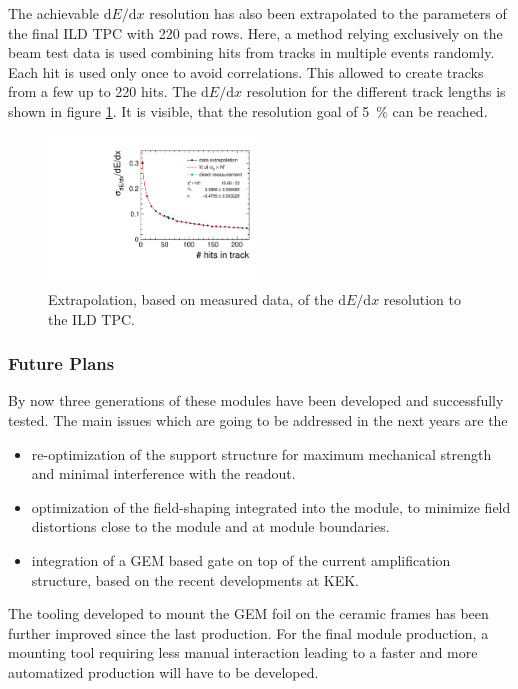 The achievable \ensuremath{\mathrm{d}E/\mathrm{d}x} resolution has also been extrapolated to the parameters of the final ILD TPC with \num{220} pad rows.
Here, a method relying exclusively on the beam test data is used combining hits from tracks in multiple events randomly.
Each hit is used only once to avoid correlations.
This allowed to create tracks from a few up to 220 hits.
The \ensuremath{\mathrm{d}E/\mathrm{d}x} resolution for the different track lengths is shown in figure \ref{sfig:dedx_reso_ILD}.
It is visible, that the resolution goal of \SI{5}{\percent} can be reached.

\begin{figure}
  \centering
\includegraphics[width=0.5\textwidth]{Tracker/TPC_Bonn/plots/TPC-DG_dEdxResVSHits_fitPar.pdf}
\caption{Extrapolation, based on measured data,  of the \ensuremath{\mathrm{d}E/\mathrm{d}x} resolution to the ILD TPC.}
\label{fig:dedx_est}
\label{sfig:dedx_reso_ILD}
\end{figure}


\subsubsection{Future Plans}

By now three generations of these modules have been developed and successfully tested. The main issues which are going to be addressed in the next years are the
\begin{itemize}
\item re-optimization of the support structure for maximum mechanical strength and minimal interference with the readout.
\item optimization of the field-shaping integrated into the module, to minimize field distortions close to the module and at module boundaries.
\item integration of a GEM based gate on top of the current amplification structure, based on the recent developments at KEK.
\end{itemize}
The tooling developed to mount the GEM foil on the ceramic frames has been further improved since the last production. 
For the final module production, a mounting tool requiring less manual interaction leading to a faster and more automatized production will have to be developed.

